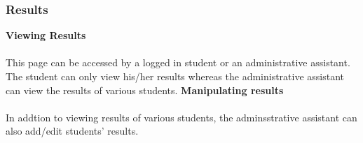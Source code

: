 \subsubsection{Results}
\textbf{Viewing Results}\\~\\
This page can be accessed by a logged in student or an administrative assistant. The student can only view his/her results whereas the administrative assistant can view the results of various students.
\textbf{Manipulating results}\\~\\
In addtion to viewing results of various students, the adminsstrative assistant can also add/edit students’ results.
